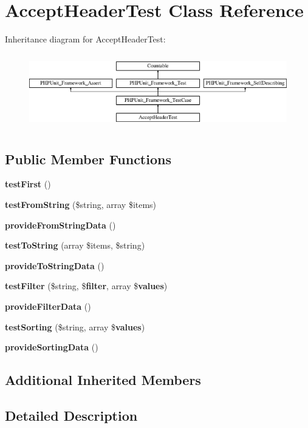 \section{Accept\+Header\+Test Class Reference}
\label{class_symfony_1_1_component_1_1_http_foundation_1_1_tests_1_1_accept_header_test}
Inheritance diagram for Accept\+Header\+Test\+:\begin{figure}[H]
\begin{center}
\leavevmode
\includegraphics[height=3.303835cm]{class_symfony_1_1_component_1_1_http_foundation_1_1_tests_1_1_accept_header_test}
\end{center}
\end{figure}
\subsection*{Public Member Functions}
\begin{DoxyCompactItemize}
\item 
{\bf test\+First} ()
\item 
{\bf test\+From\+String} (\$string, array \$items)
\item 
{\bf provide\+From\+String\+Data} ()
\item 
{\bf test\+To\+String} (array \$items, \$string)
\item 
{\bf provide\+To\+String\+Data} ()
\item 
{\bf test\+Filter} (\$string, \${\bf filter}, array \${\bf values})
\item 
{\bf provide\+Filter\+Data} ()
\item 
{\bf test\+Sorting} (\$string, array \${\bf values})
\item 
{\bf provide\+Sorting\+Data} ()
\end{DoxyCompactItemize}
\subsection*{Additional Inherited Members}


\subsection{Detailed Description}


